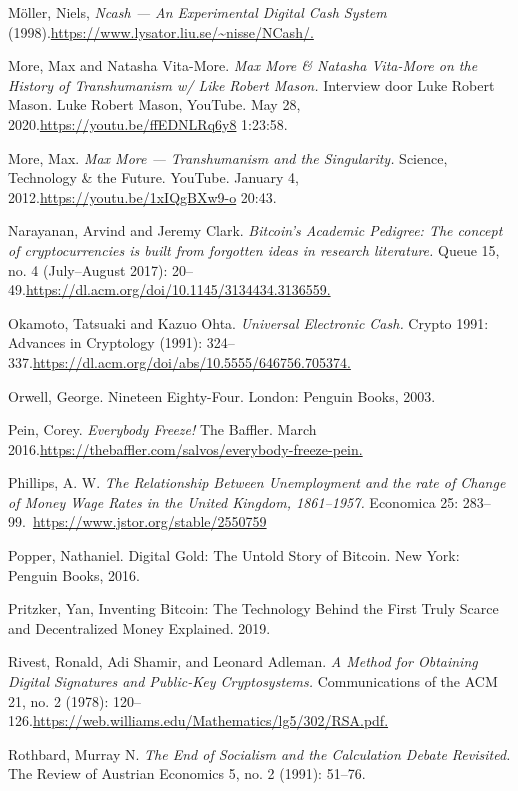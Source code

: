 \documentclass[smalldemyvopaper,11pt,twoside,onecolumn,openright,extrafontsizes,hidelinks]{memoir}
\begin{document}
Möller, Niels, \emph{Ncash --- An Experimental Digital Cash System}
(1998).\href{https://www.lysator.liu.se/~nisse/NCash/}{https://www.lysator.liu.se/\textasciitilde nisse/NCash/.}

More, Max and Natasha Vita-More. \emph{Max More \& Natasha Vita-More on
the History of Transhumanism w/ Like Robert Mason.} Interview door Luke
Robert Mason. Luke Robert Mason, YouTube. May 28,
2020.\url{https://youtu.be/ffEDNLRq6y8} 1:23:58.

More, Max. \emph{Max More --- Transhumanism and the Singularity.}
Science, Technology \& the Future. YouTube. January 4,
2012.\url{https://youtu.be/1xIQgBXw9-o} 20:43.

Narayanan, Arvind and Jeremy Clark. \emph{Bitcoin's Academic Pedigree:
The concept of cryptocurrencies is built from forgotten ideas in
research literature.} Queue 15, no. 4 (July--August 2017):
20--49.\href{https://dl.acm.org/doi/10.1145/3134434.3136559}{https://dl.acm.org/doi/10.1145/3134434.3136559.}

Okamoto, Tatsuaki and Kazuo Ohta. \emph{Universal Electronic Cash.}
Crypto 1991: Advances in Cryptology (1991):
324--337.\href{https://dl.acm.org/doi/abs/10.5555/646756.705374}{https://dl.acm.org/doi/abs/10.5555/646756.705374.}

Orwell, George. Nineteen Eighty-Four. London: Penguin Books, 2003.

Pein, Corey. \emph{Everybody Freeze!} The Baffler. March
2016.\href{https://thebaffler.com/salvos/everybody-freeze-pein}{https://thebaffler.com/salvos/everybody-freeze-pein.}

Phillips, A. W. \emph{The Relationship Between Unemployment and the rate
of Change of Money Wage Rates in the United Kingdom, 1861--1957.}
Economica 25: 283--99.~\url{https://www.jstor.org/stable/2550759}

Popper, Nathaniel. Digital Gold: The Untold Story of Bitcoin. New York:
Penguin Books, 2016.

Pritzker, Yan, Inventing Bitcoin: The Technology Behind the First Truly
Scarce and Decentralized Money Explained. 2019.

Rivest, Ronald, Adi Shamir, and Leonard Adleman. \emph{A Method for
Obtaining Digital Signatures and Public-Key Cryptosystems.}
Communications of the ACM 21, no. 2 (1978):
120--126.\href{https://web.williams.edu/Mathematics/lg5/302/RSA.pdf}{https://web.williams.edu/Mathematics/lg5/302/RSA.pdf.}

Rothbard, Murray N. \emph{The End of Socialism and the Calculation
Debate Revisited.} The Review of Austrian Economics 5, no. 2 (1991):
51--76.
\end{document}
